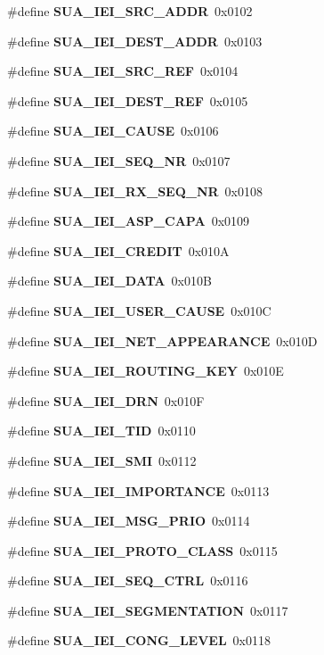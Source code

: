 \begin{DoxyCompactItemize}
\#define {\bf S\+U\+A\+\_\+\+I\+E\+I\+\_\+\+S\+R\+C\+\_\+\+A\+D\+DR}~0x0102
\item 
\#define {\bf S\+U\+A\+\_\+\+I\+E\+I\+\_\+\+D\+E\+S\+T\+\_\+\+A\+D\+DR}~0x0103
\item 
\#define {\bf S\+U\+A\+\_\+\+I\+E\+I\+\_\+\+S\+R\+C\+\_\+\+R\+EF}~0x0104
\item 
\#define {\bf S\+U\+A\+\_\+\+I\+E\+I\+\_\+\+D\+E\+S\+T\+\_\+\+R\+EF}~0x0105
\item 
\#define {\bf S\+U\+A\+\_\+\+I\+E\+I\+\_\+\+C\+A\+U\+SE}~0x0106
\item 
\#define {\bf S\+U\+A\+\_\+\+I\+E\+I\+\_\+\+S\+E\+Q\+\_\+\+NR}~0x0107
\item 
\#define {\bf S\+U\+A\+\_\+\+I\+E\+I\+\_\+\+R\+X\+\_\+\+S\+E\+Q\+\_\+\+NR}~0x0108
\item 
\#define {\bf S\+U\+A\+\_\+\+I\+E\+I\+\_\+\+A\+S\+P\+\_\+\+C\+A\+PA}~0x0109
\item 
\#define {\bf S\+U\+A\+\_\+\+I\+E\+I\+\_\+\+C\+R\+E\+D\+IT}~0x010A
\item 
\#define {\bf S\+U\+A\+\_\+\+I\+E\+I\+\_\+\+D\+A\+TA}~0x010B
\item 
\#define {\bf S\+U\+A\+\_\+\+I\+E\+I\+\_\+\+U\+S\+E\+R\+\_\+\+C\+A\+U\+SE}~0x010C
\item 
\#define {\bf S\+U\+A\+\_\+\+I\+E\+I\+\_\+\+N\+E\+T\+\_\+\+A\+P\+P\+E\+A\+R\+A\+N\+CE}~0x010D
\item 
\#define {\bf S\+U\+A\+\_\+\+I\+E\+I\+\_\+\+R\+O\+U\+T\+I\+N\+G\+\_\+\+K\+EY}~0x010E
\item 
\#define {\bf S\+U\+A\+\_\+\+I\+E\+I\+\_\+\+D\+RN}~0x010F
\item 
\#define {\bf S\+U\+A\+\_\+\+I\+E\+I\+\_\+\+T\+ID}~0x0110
\item 
\#define {\bf S\+U\+A\+\_\+\+I\+E\+I\+\_\+\+S\+MI}~0x0112
\item 
\#define {\bf S\+U\+A\+\_\+\+I\+E\+I\+\_\+\+I\+M\+P\+O\+R\+T\+A\+N\+CE}~0x0113
\item 
\#define {\bf S\+U\+A\+\_\+\+I\+E\+I\+\_\+\+M\+S\+G\+\_\+\+P\+R\+IO}~0x0114
\item 
\#define {\bf S\+U\+A\+\_\+\+I\+E\+I\+\_\+\+P\+R\+O\+T\+O\+\_\+\+C\+L\+A\+SS}~0x0115
\item 
\#define {\bf S\+U\+A\+\_\+\+I\+E\+I\+\_\+\+S\+E\+Q\+\_\+\+C\+T\+RL}~0x0116
\item 
\#define {\bf S\+U\+A\+\_\+\+I\+E\+I\+\_\+\+S\+E\+G\+M\+E\+N\+T\+A\+T\+I\+ON}~0x0117
\item 
\#define {\bf S\+U\+A\+\_\+\+I\+E\+I\+\_\+\+C\+O\+N\+G\+\_\+\+L\+E\+V\+EL}~0x0118

\end{DoxyCompactItemize}
